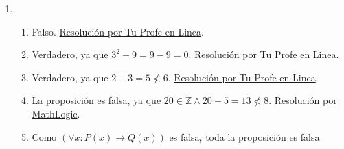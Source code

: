 \documentclass[a4paper]{article}
\newcommand{\exercise}{\item}
\newcommand{\then}{\to}
\begin{document}
\begin{enumerate}
\begin{enumerate} [label=(\alph*)]
		\item Dado el universo $U = \{x ~|~ x$ es una taza de mi cocina $\}$ y los predicados $P(x)$: \textit{"mi abuela me regaló la taza $x$"} y $Q(x)$: \textit{"la taza $x$ es de porcelana"}. Se simboliza $\forall x: P(x) \then Q(x)$, $\exists x: P(x) \land Q(x)$, $\forall x: P(x) \land Q(x)$. \href{https://youtu.be/aI-G5V-IGfA}{Resolución por Maria Alicia Piñeiro}.
		\item Dado el universo $U = \{x ~|~ x$ es una cosa $\}$ y los predicados $F(x)$:\textit{"$x$ es fácil"}, $A(x)$:\textit{"$x$ es agradable"}, $E(y)$:\textit{"$y$ estudiará"} y la constante $m=$Marta. Se simboliza \\  \Reasoning{$\left(\forall x: F(x) \land A(x) \right) \then \neg E(m)$;$\neg \left( \exists x: \neg A(x) \right)$;$\forall x: F(x)$}{$\neg E(m)$}. \\\href{https://youtu.be/M71MEB3TkVw?t=736}{Resolución por MathLogic}.
		\item \href{https://youtu.be/M71MEB3TkVw?t=1191}{Resolución por MathLogic}.
		\item Dado el universo $U = \{x ~|~ x$ es una persona$\}$, y los predicados $D(x)$:\textit{"$x$ duerme"}, $S(x)$:\textit{"$x$ tiene sueño"}, $J(x)$:\textit{"$x$ es joven"}, $A(x)$:\textit{"$x$ es arquitecto"}, $R(x)$:\textit{"$x$ escucha la radio"} y $C(x)$:\textit{"$x$ usa la computadora"}. Se simboliza $\neg D(Ana)$, $\forall x:S(x) \then  D(x)$, $\exists x: J(x) \land  S(x)$, $\forall x: A(x) \land  \neg S(x) \then  R(x)$, $\forall x: J(x) \then  S(x) \lor  C(x) $, $A(Marcos) \land  C(Marcos)$, $\neg \left(\exists x: R(x) \land  C(x) \right)$ y finalmente $\exists x: \neg A(x) \land  R(x) \land  S(x) $.
\end{enumerate}\exercise\begin{enumerate} [label=(\alph*)]		\item Falso. \href{https://youtu.be/ChfOh0xG7Ok?t=305}{Resolución por Tu Profe en Linea}.
		\item Verdadero, ya que $3^2-9=9-9=0$. \href{https://youtu.be/ChfOh0xG7Ok?t=460}{Resolución por Tu Profe en Linea}.
		\item Verdadero, ya que $2 + 3 = 5 \nless 6$. \href{https://youtu.be/ChfOh0xG7Ok?t=557}{Resolución por Tu Profe en Linea}.
		\item La proposición es falsa, ya que $20 \in \mathbb{Z} \land 20-5 = 13 \nless 8$. \href{https://youtu.be/rnaCiSpVtP4?t=303}{Resolución por MathLogic}.
		\item Como $\left(\forall x: P(x) \then  Q(x) \right)$ es falsa, toda la proposición es falsa

\end{enumerate}
\end{enumerate}
\end{document}
